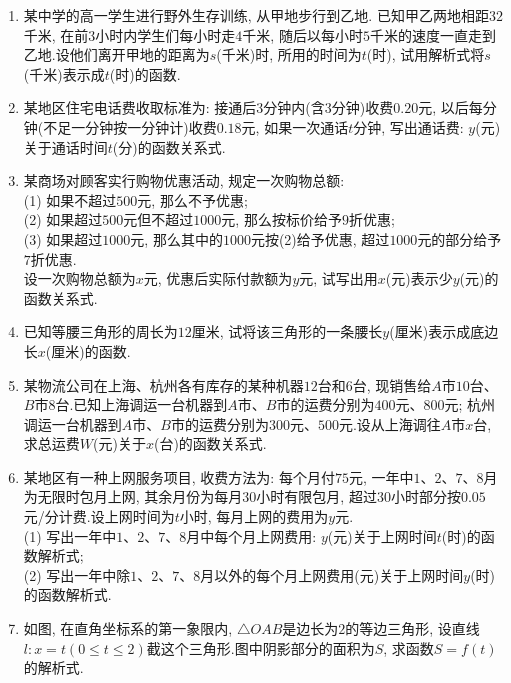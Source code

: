 \documentclass[10pt,a4paper]{article}
\begin{document}
\begin{enumerate}[1.]
\item 某中学的高一学生进行野外生存训练, 从甲地步行到乙地. 已知甲乙两地相距$32$千米, 在前$3$小时内学生们每小时走$4$千米, 随后以每小时$5$千米的速度一直走到乙地.设他们离开甲地的距离为$s$(千米)时, 所用的时间为$t$(时), 试用解析式将$s$(千米)表示成$t$(时)的函数.
\item 某地区住宅电话费收取标准为: 接通后$3$分钟内(含$3$分钟)收费$0.20$元, 以后每分钟(不足一分钟按一分钟计)收费$0.18$元, 如果一次通话$t$分钟, 写出通话费: $y$(元)关于通话时间$t$(分)的函数关系式.
\item 某商场对顾客实行购物优惠活动, 规定一次购物总额:\\ 
(1) 如果不超过$500$元, 那么不予优惠;\\
(2) 如果超过$500$元但不超过$1000$元, 那么按标价给予$9$折优惠;\\
(3) 如果超过$1000$元, 那么其中的$1000$元按(2)给予优惠, 超过$1000$元的部分给予$7$折优惠.\\
设一次购物总额为$x$元, 优惠后实际付款额为$y$元, 试写出用$x$(元)表示少$y$(元)的函数关系式.
\item 已知等腰三角形的周长为$12$厘米, 试将该三角形的一条腰长$y$(厘米)表示成底边长$x$(厘米)的函数.
\item 某物流公司在上海、杭州各有库存的某种机器$12$台和$6$台, 现销售给$A$市$10$台、$B$市$8$台.已知上海调运一台机器到$A$市、$B$市的运费分别为$400$元、$800$元; 杭州调运一台机器到$A$市、$B$市的运费分别为$300$元、$500$元.设从上海调往$A$市$x$台, 求总运费$W$(元)关于$x$(台)的函数关系式.
\item 某地区有一种上网服务项目, 收费方法为: 每个月付$75$元, 一年中$1$、$2$、$7$、$8$月为无限时包月上网, 其余月份为每月$30$小时有限包月, 超过$30$小时部分按$0.05$元/分计费.设上网时间为$t$小时, 每月上网的费用为$y$元.\\
(1) 写出一年中$1$、$2$、$7$、$8$月中每个月上网费用: $y$(元)关于上网时间$t$(时)的函数解析式;\\
(2) 写出一年中除$1$、$2$、$7$、$8$月以外的每个月上网费用(元)关于上网时间$y$(时)的函数解析式.
\item 如图, 在直角坐标系的第一象限内, $\triangle OAB$是边长为$2$的等边三角形, 设直线$l:x=t(0\le t\le 2)$截这个三角形.图中阴影部分的面积为$S$, 求函数$S=f(t)$的解析式.
\begin{center}
\end{center}
\end{enumerate}
\end{document}
